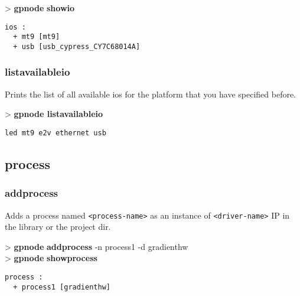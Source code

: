 \documentclass[10pt,a4paper]{article}
\begin{document}
\begin{sampletitle}
> \textbf{gpnode} \textbf{showio}
\begin{Verbatim}
ios :
  + mt9 [mt9]
  + usb [usb_cypress_CY7C68014A]
\end{Verbatim}
\end{sampletitle}

\subsubsection{listavailableio}

Prints the list of all available ios for the platform that you have specified before.

\begin{sampletitle}
> \textbf{gpnode listavailableio}
\begin{Verbatim}
led mt9 e2v ethernet usb
\end{Verbatim}
\end{sampletitle}

\subsection{process}
\subsubsection{addprocess}

Adds a process named \texttt{<process-name>} as an instance of \texttt{<driver-name>} IP in the library or the project dir.


\begin{sampletitle}
> \textbf{gpnode} \textbf{addprocess} -n process1 -d gradienthw\\
> \textbf{gpnode} \textbf{showprocess}
\begin{Verbatim}
process :
  + process1 [gradienthw]
\end{Verbatim}
\end{sampletitle}
\end{document}
